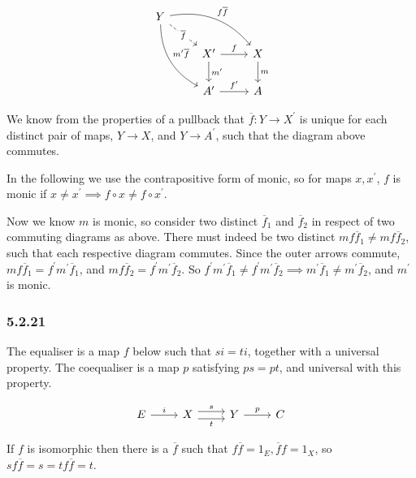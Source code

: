 \documentclass{article}
\begin{document}
\begin{equation*}
\begin{tikzcd}
Y
\arrow[drr, bend left, "f \overline{f}"]
\arrow[ddr, bend right, "m^\prime\overline{f}"]
\arrow[dr, dashed, "\overline{f}" description] & \\
& X^\prime \arrow[r, "f"] \arrow[d, "m^\prime"]
& X \arrow[d,"m"] \\
& A^\prime \arrow[r, "f^\prime"]
& A
\end{tikzcd}
\end{equation*}

We know from the properties of a pullback that $\overline{f}: Y \rightarrow X^\prime$ is unique for each distinct pair of maps, $Y \rightarrow X$, and $Y \rightarrow A^\prime$, such that the diagram above commutes.

In the following we use the contrapositive form of monic, so for maps $x, x^\prime$, $f$ is monic if $x \neq x^\prime \implies f \circ x \neq f \circ x^\prime$.

Now we know $m$ is monic, so consider two distinct $\overline{f}_1$ and $\overline{f}_2$ in respect of two commuting diagrams as above. There must indeed be two distinct $mf\overline{f}_1 \neq mf\overline{f}_2$, such that each respective diagram commutes. Since the outer arrows commute, $mf\overline{f}_1 = f^\prime m^\prime \overline{f}_1$, and $mf\overline{f}_2 = f^\prime m^\prime \overline{f}_2$. So $f^\prime m^\prime \overline{f}_1 \neq f^\prime m^\prime \overline{f}_2 \implies m^\prime \overline{f}_1 \neq m^\prime \overline{f}_2$, and $m^\prime$ is monic.

\subsubsection*{5.2.21}

The equaliser is a map $f$ below such that $si = ti$, together with a universal property. The coequaliser is a map $p$ satisfying $ps=pt$, and universal with this property.

\begin{equation*}
\begin{tikzcd}
E  \ar[r,"i"] &
X \ar[r,shift left=.75ex,"s"]
  \ar[r,shift right=.75ex,swap,"t"] & Y
  \ar[r,"p"] & C
\end{tikzcd}
\end{equation*}

If $f$ is isomorphic then there is a $\overline{f}$ such that $f\overline{f}=1_E, \overline{f}f=1_X$, so $sf\overline{f} = s = tf\overline{f}=t$.
\end{document}
